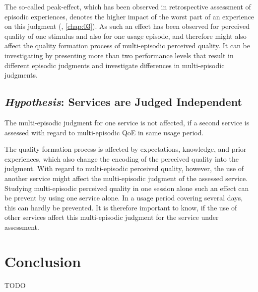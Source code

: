 The so-called peak-effect, which has been observed in retrospective assessment of episodic experiences, denotes the higher impact of the worst part of an experience on this judgment (\cf, \autoref{chap:03}).
As such an effect has been observed for perceived quality of one stimulus and also for one usage episode, and therefore might also affect the quality formation process of multi-episodic perceived quality.
It can be investigating by presenting more than two performance levels that result in different episodic judgments and investigate differences in multi-episodic judgments.

\subsection{\emph{Hypothesis}: Services are Judged Independent}
\begin{hypothesis}\label{hypo:independent}
The multi-episodic judgment for one service is not affected, if a second service is assessed with regard to multi-episodic QoE in same usage period.
\end{hypothesis}

The quality formation process is affected by expectations, knowledge, and prior experiences, which also change the encoding of the perceived quality into the judgment.
With regard to multi-episodic perceived quality, however, the use of another service might affect the multi-episodic judgment of the assessed service.
Studying multi-episodic perceived quality in one session alone such an effect can be prevent by using one service alone.
In a usage period covering several days, this can hardly be prevented.
It is therefore important to know, if the use of other services affect this multi-episodic judgment for the service under assessment.



\section{Conclusion}
TODO
